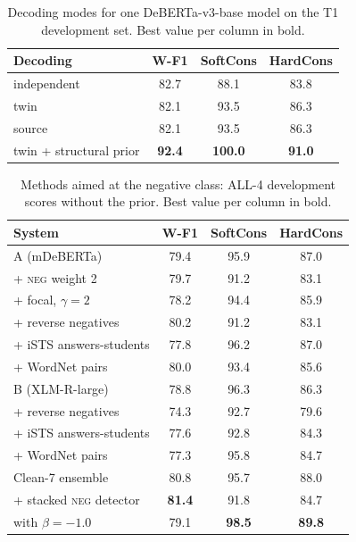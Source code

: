 \documentclass[conference]{IEEEtran}
\newcommand{\NEG}{\textsc{neg}}
\begin{document}
\begin{table}[t]
\centering
\caption{Decoding modes for one DeBERTa-v3-base model on the T1 development
set. Best value per column in bold.}
\label{tab:decoding}
\begin{tabular}{lccc}
\toprule
Decoding & W-F1 & SoftCons & HardCons \\
\midrule
independent & 82.7 & 88.1 & 83.8 \\
twin        & 82.1 & 93.5 & 86.3 \\
source      & 82.1 & 93.5 & 86.3 \\
twin + structural prior & \textbf{92.4} & \textbf{100.0} & \textbf{91.0} \\
\bottomrule
\end{tabular}
\end{table}

\begin{table}[!t]
\centering
\caption{Methods aimed at the negative class: ALL-4 development scores
without the prior. Best value per column in bold.}
\label{tab:neg}
\begin{tabular}{lccc}
\toprule
System & W-F1 & SoftCons & HardCons \\
\midrule
A (mDeBERTa)            & 79.4 & 95.9 & 87.0 \\
\quad + \NEG{} weight 2  & 79.7 & 91.2 & 83.1 \\
\quad + focal, $\gamma=2$ & 78.2 & 94.4 & 85.9 \\
\quad + reverse negatives & 80.2 & 91.2 & 83.1 \\
\quad + iSTS answers-students & 77.8 & 96.2 & 87.0 \\
\quad + WordNet pairs & 80.0 & 93.4 & 85.6 \\
\midrule
B (XLM-R-large)         & 78.8 & 96.3 & 86.3 \\
\quad + reverse negatives & 74.3 & 92.7 & 79.6 \\
\quad + iSTS answers-students & 77.6 & 92.8 & 84.3 \\
\quad + WordNet pairs & 77.3 & 95.8 & 84.7 \\
\midrule
Clean-7 ensemble        & 80.8 & 95.7 & 88.0 \\
\quad + stacked \NEG{} detector & \textbf{81.4} & 91.8 & 84.7 \\
\quad with $\beta=-1.0$ & 79.1 & \textbf{98.5} & \textbf{89.8} \\
\bottomrule
\end{tabular}
\end{table}
\end{document}
